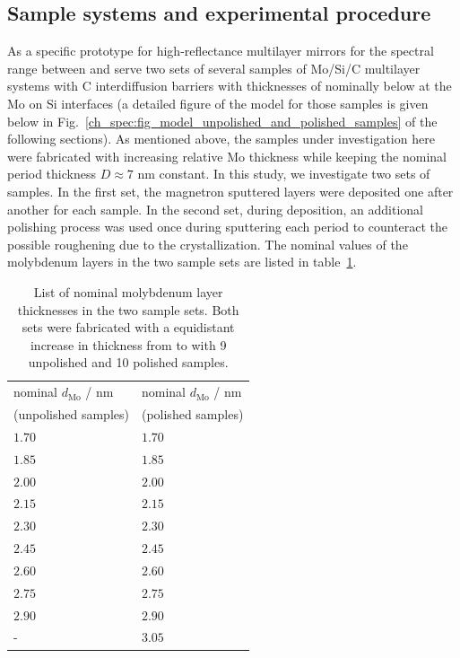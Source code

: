 \subsection{Sample systems and experimental procedure}
As a specific prototype for high-reflectance multilayer mirrors for the spectral range between  and  serve two sets of several samples of Mo/Si/C multilayer systems with C interdiffusion barriers with thicknesses of nominally below  at the Mo on Si interfaces (a detailed figure of the model for those samples is given below in Fig.~\ref{ch_spec:fig_model_unpolished_and_polished_samples} of the following sections). As mentioned above, the samples under investigation here were fabricated with increasing relative Mo thickness while keeping the nominal period thickness $D\approx 7$ nm constant. In this study, we investigate two sets of samples. In the first set, the magnetron sputtered layers were deposited one after another for each sample. In the second set, during deposition, an additional polishing process was used once during sputtering each period to counteract the possible roughening due to the crystallization. The nominal values of the molybdenum layers in the two sample sets are listed in table~\ref{ch_spec:tbl_mo_si_thickness_nominal}.
\begin{table}[htbp]
\centering
\caption{List of nominal molybdenum layer thicknesses in the two sample sets. Both sets were fabricated with a equidistant increase in thickness from  to  with 9 unpolished and 10 polished samples.}
\label{ch_spec:tbl_mo_si_thickness_nominal}
\begin{tabular}{@{}ll@{}}
\toprule
nominal $d_\text{Mo}$ / nm & nominal $d_\text{Mo}$ / nm\\ 
(unpolished samples) & (polished samples) \\
\midrule
$1.70$& $1.70$\\ 
$1.85$& $1.85$\\ 
$2.00$ & $2.00$\\ 
$2.15$ & $2.15$\\ 
$2.30$& $2.30$\\ 
$2.45$& $2.45$\\ 
$2.60$& $2.60$\\ 
$2.75$ & $2.75$\\ 
$2.90$ & $2.90$\\ 
-& $3.05$\\ 
 \bottomrule
\end{tabular}
\end{table}

